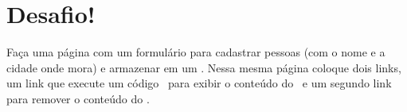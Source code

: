 \section{Desafio!}
\label{cap10-desafio}

Faça uma página com um formulário para cadastrar pessoas (com o nome e a cidade onde mora) e armazenar 
em um \cookie. Nessa mesma página coloque dois links, um link que execute um código \php~para exibir o 
conteúdo do \cookie~e um segundo link para remover o conteúdo do \cookie.



